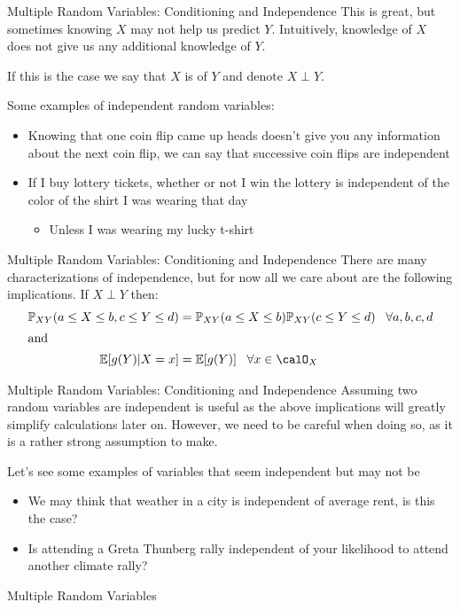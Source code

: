 \documentclass[notheorems,9pt]{beamer}
\begin{document}
\begin{frame}{Multiple Random Variables: Conditioning and Independence} 
	\label{frame:mrv-independence}
	This is great, but sometimes knowing \(X\) may not help us predict \(Y\). Intuitively, knowledge of \(X\) does not give us any additional knowledge of \(Y\). 

	If this is the case we say that \(X\) is  of \(Y\) and denote \(X\perp Y\).

	Some examples of independent random variables:
	\begin{itemize}
		\item<2-> Knowing that one coin flip came up heads doesn't give you any information about the next coin flip, we can say that successive coin flips are independent
		\item<3-> If I buy lottery tickets, whether or not I win the lottery is independent of the color of the shirt I was wearing that day
		\begin{itemize}
			\item<4-> Unless I was wearing my lucky t-shirt
		\end{itemize}
	\end{itemize}
\end{frame}
\begin{frame}{Multiple Random Variables: Conditioning and Independence} 
	\label{frame:mrv-indep-charac}
	There are many characterizations of independence, but for now all we care about are the following implications. If \(X\perp Y\) then:
	\begin{align*}
		\P_{XY}(a\leq X\leq b, c\leq Y\leq d) &= \P_{XY}(a\leq X\leq b)\P_{XY}(c\leq Y\leq d)\;\;\;\forall a,b,c,d\\
		\intertext{and}
		\E[g(Y)|X=x] &= \E[g(Y)]\;\;\;\forall x\in\calO_X
	\end{align*}
\end{frame}
\begin{frame}{Multiple Random Variables: Conditioning and Independence} 
	\label{frame:mrc-indep-careful}
	Assuming two random variables are independent is useful as the above implications will greatly simplify calculations later on. However, we need to be careful when doing so, as it is a rather strong assumption to make.

	Let's see some examples of variables that seem independent but may not be
	\begin{itemize}
		\item We may think that weather in a city is independent of average rent, is this the case?
		\item Is attending a Greta Thunberg rally independent of your likelihood to attend another climate rally?
	\end{itemize}
\end{frame}
\begin{frame}{Multiple Random Variables} 
	\centering{}	
\end{frame}
\end{document}
